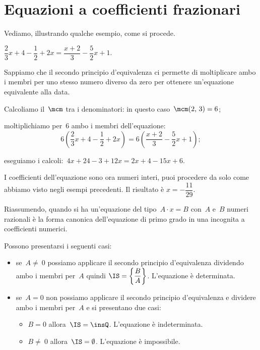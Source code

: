 \section{Equazioni a coefficienti frazionari}
Vediamo, illustrando qualche esempio, come si procede.

\begin{exrig}
 \begin{esempio}
$\dfrac{2}{3}x+4-\dfrac{1}{2}+2x=\dfrac{x+2}{3}-\dfrac{5}{2}x+1$.

Sappiamo che il secondo principio d'equivalenza ci
permette di moltiplicare ambo i membri per uno stesso numero diverso da
zero per ottenere un'equazione equivalente alla data.
\begin{enumeratea}
\item Calcoliamo il~$\mcm$ tra i denominatori: in questo
caso~$\mcm(2\text{,~}3) = 6$;

\item moltiplichiamo per~6 ambo i membri
dell'equazione:
\[6\left(\dfrac{2}{3}x+4-\dfrac{1}{2}+2x\right)=6\left(\dfrac{x+2}{3}-\dfrac{5}{2}x+1\right);\]

\item eseguiamo i calcoli:~$4x+24-3+12x=2x+4-15x+6$.
\end{enumeratea}

I coefficienti dell'equazione sono ora numeri interi,
puoi procedere da solo come abbiamo visto negli esempi precedenti. Il risultato è $x=-\dfrac{11}{29}$.
\end{esempio}
\end{exrig}

\ovalbox{\risolvii \ref{ese:15.23}, \ref{ese:15.24}}\vspace{1.10ex}

Riassumendo, quando si ha un'equazione del tipo~$A\cdot x=B$ con~$A$ e~$B$ numeri
razionali è la forma canonica dell'equazione di primo grado in una
incognita a coefficienti numerici.%

Possono presentarsi i seguenti casi:
 \begin{itemize}
 \item se~$A\neq~0$ possiamo applicare il secondo principio
d'equivalenza dividendo ambo i membri per~$A$ quindi
$\IS =\left\{\dfrac{B}{A}\right\}$. L'equazione
è determinata.

 \item se~$A=0$ non possiamo applicare il secondo principio
d'equivalenza e dividere ambo i membri per~$A$ e si
presentano due casi:

\begin{itemize}
 \item $B=0$ allora~$\IS =\insQ$. L'equazione
è indeterminata.

\item $B\neq~0$ allora~$\IS =\emptyset $.
L'equazione è impossibile.
\end{itemize}
 \end{itemize}

